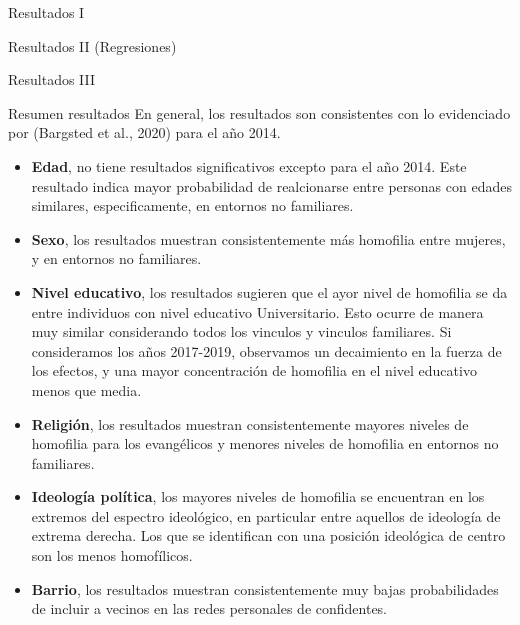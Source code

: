 \documentclass[
  8pt,
  ignorenonframetext,
]{beamer}
\begin{document}
\begin{frame}{Resultados I}
\protect\hypertarget{resultados-i}{}
\end{frame}

\begin{frame}{Resultados II (Regresiones)}
\protect\hypertarget{resultados-ii-regresiones}{}
\end{frame}

\begin{frame}{Resultados III}
\protect\hypertarget{resultados-iii}{}
\end{frame}

\begin{frame}{Resumen resultados}
\protect\hypertarget{resumen-resultados}{}
En general, los resultados son consistentes con lo evidenciado por
(Bargsted et al., 2020) para el año 2014.

\begin{itemize}
\item
  \textbf{Edad}, no tiene resultados significativos excepto para el año
  2014. Este resultado indica mayor probabilidad de realcionarse entre
  personas con edades similares, especificamente, en entornos no
  familiares.
\item
  \textbf{Sexo}, los resultados muestran consistentemente más homofilia
  entre mujeres, y en entornos no familiares.
\item
  \textbf{Nivel educativo}, los resultados sugieren que el ayor nivel de
  homofilia se da entre individuos con nivel educativo Universitario.
  Esto ocurre de manera muy similar considerando todos los vinculos y
  vinculos familiares. Si consideramos los años 2017-2019, observamos un
  decaimiento en la fuerza de los efectos, y una mayor concentración de
  homofilia en el nivel educativo menos que media.
\item
  \textbf{Religión}, los resultados muestran consistentemente mayores
  niveles de homofilia para los evangélicos y menores niveles de
  homofilia en entornos no familiares.
\item
  \textbf{Ideología política}, los mayores niveles de homofilia se
  encuentran en los extremos del espectro ideológico, en particular
  entre aquellos de ideología de extrema derecha. Los que se identifican
  con una posición ideológica de centro son los menos homofílicos.
\item
  \textbf{Barrio}, los resultados muestran consistentemente muy bajas
  probabilidades de incluir a vecinos en las redes personales de
  confidentes.
\end{itemize}
\end{frame}
\end{document}
